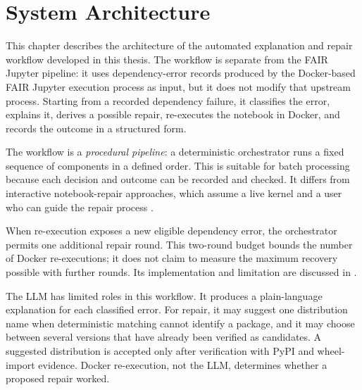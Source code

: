 %

\chapter{System Architecture}
\label{chap:architecture}

This chapter describes the architecture of the automated explanation and
repair workflow developed in this thesis. The workflow is separate from the
FAIR Jupyter pipeline: it uses dependency-error records produced by the
Docker-based FAIR Jupyter execution process as input, but it does not modify
that upstream process. Starting from a recorded dependency failure, it
classifies the error, explains it, derives a possible repair, re-executes the
notebook in Docker, and records the outcome in a structured form.

The workflow is a \emph{procedural pipeline}: a deterministic orchestrator
runs a fixed sequence of components in a defined order. This is suitable for
batch processing because each decision and outcome can be recorded and
checked. It differs from interactive notebook-repair approaches, which assume
a live kernel and a user who can guide the repair process
\cite{grotov2024untangling,grotov2024debug}.

When re-execution exposes a new eligible dependency error, the orchestrator
permits one additional repair round. This two-round budget bounds the number
of Docker re-executions; it does not claim to measure the maximum recovery
possible with further rounds. Its implementation and limitation are discussed
in .

The LLM has limited roles in this workflow. It produces a plain-language
explanation for each classified error. For repair, it may suggest one
distribution name when deterministic matching cannot identify a package, and
it may choose between several versions that have already been verified as
candidates. A suggested distribution is accepted only after verification with
PyPI and wheel-import evidence. Docker re-execution, not the LLM, determines
whether a proposed repair worked.

